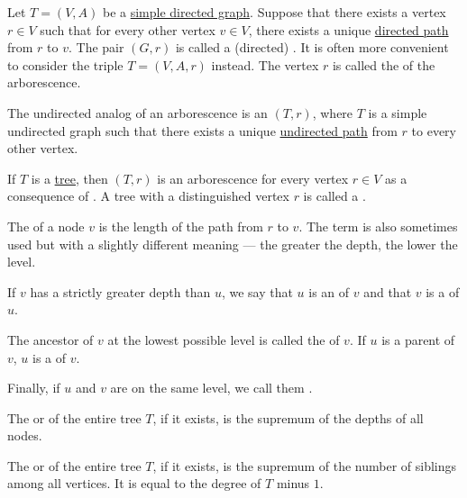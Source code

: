 \begin{definition}\label{def:arborescence}
  Let \( T = (V, A) \) be a \hyperref[def:quiver/simple]{simple directed graph}. Suppose that there exists a vertex \( r \in V \) such that for every other vertex \( v \in V \), there exists a unique \hyperref[def:quiver_path/directed]{directed path} from \( r \) to \( v \). The pair \( (G, r) \) is called a (directed) . It is often more convenient to consider the triple \( T = (V, A, r) \) instead. The vertex \( r \) is called the  of the arborescence.

  \begin{thmenum}
     The undirected analog of an arborescence is an  \( (T, r) \), where \( T \) is a simple undirected graph such that there exists a unique \hyperref[def:undirected_multigraph_path]{undirected path} from \( r \) to every other vertex.

    If \( T \) is a \hyperref[def:tree]{tree}, then \( (T, r) \) is an arborescence for every vertex \( r \in V \) as a consequence of . A tree with a distinguished vertex \( r \) is called a .

     The  of a node \( v \) is the length of the path from \( r \) to \( v \). The term  is also sometimes used but with a slightly different meaning --- the greater the depth, the lower the level.

     If \( v \) has a strictly greater depth than \( u \), we say that \( u \) is an  of \( v \) and that \( v \) is a  of \( u \).

    The ancestor of \( v \) at the lowest possible level is called the  of \( v \). If \( u \) is a parent of \( v \), \( u \) is a  of \( v \).

    Finally, if \( u \) and \( v \) are on the same level, we call them .

     The  or  of the entire tree \( T \), if it exists, is the supremum of the depths of all nodes.

     The  or  of the entire tree \( T \), if it exists, is the supremum of the number of siblings among all vertices. It is equal to the degree of \( T \) minus \( 1 \).


\end{thmenum}
\end{definition}
